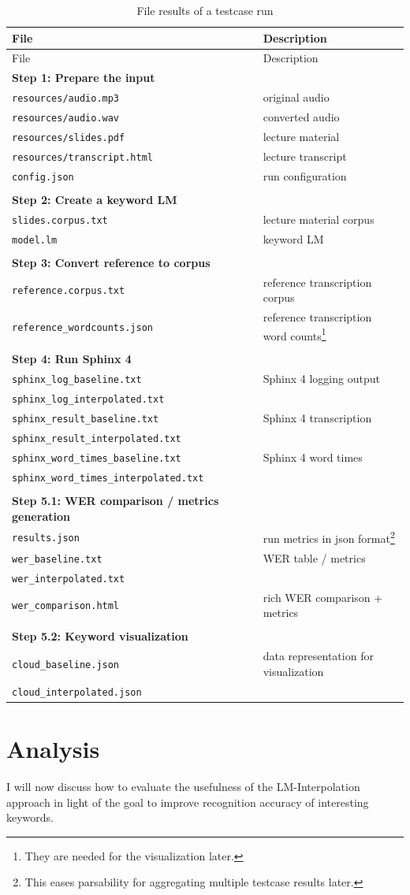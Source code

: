 \documentclass[]{article}
\begin{document}
\begin{longtable}[c]{@{}ll@{}}
\caption{File results of a testcase run\label{files}}\tabularnewline
\toprule
File & Description\tabularnewline
\midrule
\endfirsthead
\toprule
File & Description\tabularnewline
\midrule
\endhead
\textbf{Step 1: Prepare the input} &\tabularnewline
\texttt{resources/audio.mp3} & original audio\tabularnewline
\texttt{resources/audio.wav} & converted audio\tabularnewline
\texttt{resources/slides.pdf} & lecture material\tabularnewline
\texttt{resources/transcript.html} & lecture transcript\tabularnewline
\texttt{config.json} & run configuration\tabularnewline
&\tabularnewline
\textbf{Step 2: Create a keyword LM} &\tabularnewline
\texttt{slides.corpus.txt} & lecture material corpus\tabularnewline
\texttt{model.lm} & keyword LM\tabularnewline
&\tabularnewline
\textbf{Step 3: Convert reference to corpus} &\tabularnewline
\texttt{reference.corpus.txt} & reference transcription
corpus\tabularnewline
\texttt{reference\_wordcounts.json} & reference transcription word
counts\footnote{They are needed for the visualization later.}\tabularnewline
&\tabularnewline
\textbf{Step 4: Run Sphinx 4} &\tabularnewline
\texttt{sphinx\_log\_baseline.txt} & Sphinx 4 logging
output\tabularnewline
\texttt{sphinx\_log\_interpolated.txt} &\tabularnewline
\texttt{sphinx\_result\_baseline.txt} & Sphinx 4
transcription\tabularnewline
\texttt{sphinx\_result\_interpolated.txt} &\tabularnewline
\texttt{sphinx\_word\_times\_baseline.txt} & Sphinx 4 word
times\tabularnewline
\texttt{sphinx\_word\_times\_interpolated.txt} &\tabularnewline
&\tabularnewline
\textbf{Step 5.1: WER comparison / metrics generation} &\tabularnewline
\texttt{results.json} & run metrics in json format\footnote{This eases
  parsability for aggregating multiple testcase results later.}\tabularnewline
\texttt{wer\_baseline.txt} & WER table / metrics\tabularnewline
\texttt{wer\_interpolated.txt} &\tabularnewline
\texttt{wer\_comparison.html} & rich WER comparison +
metrics\tabularnewline
&\tabularnewline
\textbf{Step 5.2: Keyword visualization} &\tabularnewline
\texttt{cloud\_baseline.json} & data representation for
visualization\tabularnewline
\texttt{cloud\_interpolated.json} &\tabularnewline
\bottomrule
\end{longtable}

\section{Analysis}\label{analysis}

I will now discuss how to evaluate the usefulness of the
LM-Interpolation approach in light of the goal to improve recognition
accuracy of interesting keywords.
\end{document}
